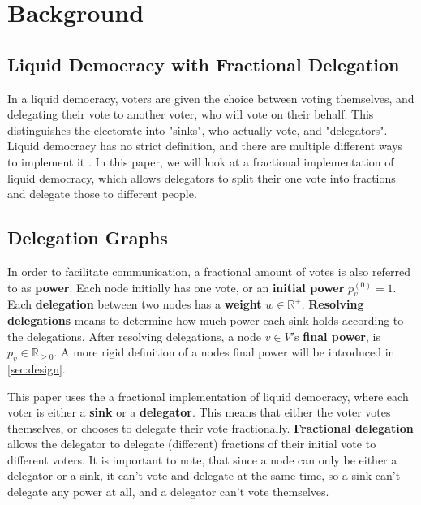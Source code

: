 
\chapter{Background}

\section{Liquid Democracy with Fractional Delegation}

In a liquid democracy, voters are given the choice between voting themselves, and delegating their vote to another voter, who will vote on their behalf. This distinguishes the electorate into "sinks", who actually vote, and "delegators". Liquid democracy has no strict definition, and there are multiple different ways to implement it . In this paper, we will look at a fractional implementation of liquid democracy, which allows delegators to split their one vote into fractions and delegate those to different people.


 \section{Delegation Graphs}
 
In order to facilitate communication, a fractional amount of votes is also referred to as \textbf{power}. Each node initially has one vote, or an \textbf{initial power} $p^{(0)}_v = 1$. Each \textbf{delegation} between two nodes has a \textbf{weight} $w \in \mathbb{R}^+$.  \textbf{Resolving delegations} means to determine how much power each sink holds according to the delegations. After resolving delegations, a node $v \in V'$s \textbf{final power}, is $p_v \in \mathbb{R}_{\ge0}$. A more rigid definition of a nodes final power will be introduced in \cref{sec:design}.

This paper uses the a fractional implementation of liquid democracy, where each voter is either a \textbf{sink} or a \textbf{delegator}. This means that either the voter votes themselves, or chooses to delegate their vote fractionally. \textbf{Fractional delegation} allows the delegator to delegate (different) fractions of their initial vote to different voters. It is important to note, that since a node can only be either a delegator or a sink, it can't vote and delegate at the same time, so a sink can't delegate any power at all, and a delegator can't vote themselves. 
 
